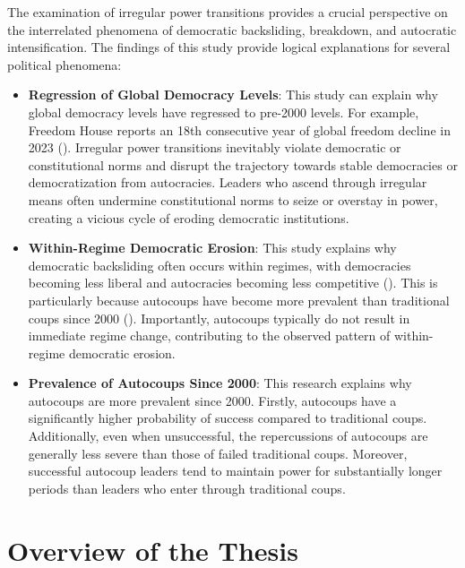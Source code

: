\documentclass[
  12pt,
]{report}
\begin{document}
The examination of irregular power transitions provides a crucial
perspective on the interrelated phenomena of democratic backsliding,
breakdown, and autocratic intensification. The findings of this study
provide logical explanations for several political phenomena:

\begin{itemize}
\item
  \textbf{Regression of Global Democracy Levels}: This study can explain
  why global democracy levels have regressed to pre-2000 levels. For
  example, Freedom House reports an 18th consecutive year of global
  freedom decline in 2023
  ().
  Irregular power transitions inevitably violate democratic or
  constitutional norms and disrupt the trajectory towards stable
  democracies or democratization from autocracies. Leaders who ascend
  through irregular means often undermine constitutional norms to seize
  or overstay in power, creating a vicious cycle of eroding democratic
  institutions.
\item
  \textbf{Within-Regime Democratic Erosion}: This study explains why
  democratic backsliding often occurs within regimes, with democracies
  becoming less liberal and autocracies becoming less competitive
  ().
  This is particularly because autocoups have become more prevalent than
  traditional coups since 2000 ().
  Importantly, autocoups typically do not result in immediate regime
  change, contributing to the observed pattern of within-regime
  democratic erosion.
\item
  \textbf{Prevalence of Autocoups Since 2000}: This research explains
  why autocoups are more prevalent since 2000. Firstly, autocoups have a
  significantly higher probability of success compared to traditional
  coups. Additionally, even when unsuccessful, the repercussions of
  autocoups are generally less severe than those of failed traditional
  coups. Moreover, successful autocoup leaders tend to maintain power
  for substantially longer periods than leaders who enter through
  traditional coups.
\end{itemize}

\section{Overview of the Thesis}\label{overview-of-the-thesis}
\end{document}
